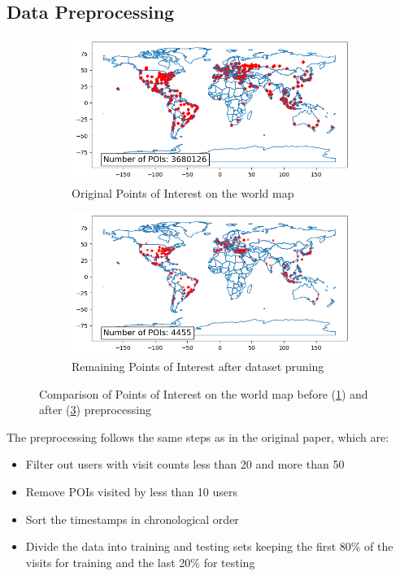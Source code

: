 \documentclass[twocolumn,twoside]{article}
\begin{document}
\subsection{Data Preprocessing}


\begin{figure}[ht]
  \centering
  \begin{subfigure}[b]{0.95\linewidth}
    \centering
    \includegraphics[width=\linewidth]{poi_original.png}
    \caption{Original Points of Interest on the world map}
    \label{fig:data}
  \end{subfigure}
  \hfill
  \begin{subfigure}[b]{0.95\linewidth}
    \centering
    \includegraphics[width=\linewidth]{poi_after_processing.png}
    \caption{Remaining Points of Interest after dataset pruning}
    \label{fig:preprocessed_data}
  \end{subfigure}
  \caption{Comparison of Points of Interest on the world map before (\ref{fig:data}) and after (\ref{fig:preprocessed_data}) preprocessing}
\end{figure}


The preprocessing follows the same steps as in the original paper, which are:
\begin{itemize}
  \item Filter out users with visit counts less than 20 and more than 50
  \item Remove POIs visited by less than 10 users
  \item Sort the timestamps in chronological order
  \item Divide the data into training and testing sets keeping the first 80\% of the visits for training and the last 20\% for testing
\end{itemize}
\end{document}
